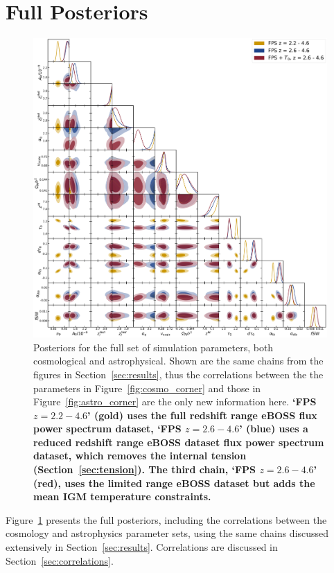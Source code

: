 \section{Full Posteriors}
\label{sec:full_posteriors}
\begin{figure}
    \centering
    \includegraphics[width=\textwidth]{figures/allp_corner.pdf}
    \caption{\label{fig:full_posterior}
    Posteriors for the full set of simulation parameters, both cosmological and astrophysical.
    Shown are the same chains from the figures in Section~\ref{sec:results}, thus the correlations between the the parameters in Figure~\ref{fig:cosmo_corner} and those in Figure~\ref{fig:astro_corner} are the only new information here. \textbf{`FPS $z=2.2-4.6$' (gold) uses the full redshift range eBOSS flux power spectrum dataset, `FPS $z=2.6-4.6$' (blue) uses a reduced redshift range eBOSS dataset flux power spectrum dataset, which removes the internal tension (Section~\ref{sec:tension}).
    The third chain, `FPS $z=2.6-4.6$' (red), uses the limited range eBOSS dataset but adds the mean IGM temperature constraints.}
    }
\end{figure}

Figure~\ref{fig:full_posterior} presents the full posteriors, including the correlations between the cosmology and astrophysics parameter sets, using the same chains discussed extensively in Section~\ref{sec:results}.
Correlations are discussed in Section~\ref{sec:correlations}.

